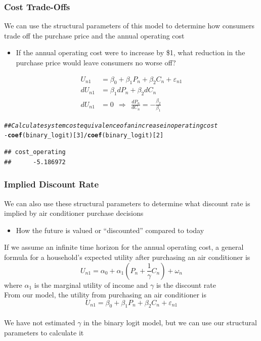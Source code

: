 \documentclass{beamer}\usepackage[]{graphicx}\usepackage[]{color}
\makeatletter
\newcommand{\hlnum}[1]{\textcolor[rgb]{0.686,0.059,0.569}{#1}}%
\newcommand{\hlcom}[1]{\textcolor[rgb]{0.678,0.584,0.686}{\textit{#1}}}%
\newcommand{\hlopt}[1]{\textcolor[rgb]{0,0,0}{#1}}%
\newcommand{\hlstd}[1]{\textcolor[rgb]{0.345,0.345,0.345}{#1}}%
\newcommand{\hlkwd}[1]{\textcolor[rgb]{0.737,0.353,0.396}{\textbf{#1}}}%
\newenvironment{kframe}{%
 \def\at@end@of@kframe{}%
 \ifinner\ifhmode%
  \def\at@end@of@kframe{\end{minipage}}%
  \begin{minipage}{\columnwidth}%
 \fi\fi%
 \def\FrameCommand##1{\hskip\@totalleftmargin \hskip-\fboxsep
 \colorbox{shadecolor}{##1}\hskip-\fboxsep
     \hskip-\linewidth \hskip-\@totalleftmargin \hskip\columnwidth}%
 \MakeFramed {\advance\hsize-\width
   \@totalleftmargin\z@ \linewidth\hsize
   \@setminipage}}%
 {\par\unskip\endMakeFramed%
 \at@end@of@kframe}
\newenvironment{knitrout}{}{} %
\makeatother
\begin{document}
\begin{frame}[fragile]\frametitle{Cost Trade-Offs}
    We can use the structural parameters of this model to determine how consumers trade off the purchase price and the annual operating cost
    \begin{itemize}
        \item If the annual operating cost were to increase by \$1, what reduction in the purchase price would leave consumers no worse off?
    \end{itemize}
    \begin{align*}
        U_{n1} & = \beta_0 + \beta_1 P_n + \beta_2 C_n + \varepsilon_{n1} \\
        dU_{n1} & = \beta_1 dP_n + \beta_2 dC_n \\
        dU_{n1} & = 0 ~~ \Rightarrow ~~ \frac{dP_n}{dC_n}  = -\frac{\beta_2}{\beta_1}
    \end{align*}
\begin{knitrout}\footnotesize
{}\color{fgcolor}\begin{kframe}
\begin{alltt}
\hlcom{## Calculate system cost equivalence of an increase in operating cost}
\hlopt{-}\hlkwd{coef}\hlstd{(binary_logit)[}\hlnum{3}\hlstd{]} \hlopt{/} \hlkwd{coef}\hlstd{(binary_logit)[}\hlnum{2}\hlstd{]}
\end{alltt}
\begin{verbatim}
## cost_operating 
##      -5.186972
\end{verbatim}
\end{kframe}
\end{knitrout}
\end{frame}

\begin{frame}\frametitle{Implied Discount Rate}
    We can also use these structural parameters to determine what discount rate is implied by air conditioner purchase decisions
    \begin{itemize}
        \item How the future is valued or ``discounted'' compared to today
    \end{itemize}
    \vspace{2ex}
    If we assume an infinite time horizon for the annual operating cost, a general formula for a household's expected utility after purchasing an air conditioner is
    $$U_{n1} = \alpha_0 + \alpha_1 \left( P_n + \frac{1}{\gamma} C_n \right) + \omega_n$$
    where $\alpha_1$ is the marginal utility of income and $\gamma$ is the discount rate \\
    \vspace{2ex}
    From our model, the utility from purchasing an air conditioner is
    $$U_{n1} = \beta_0 + \beta_1 P_n + \beta_2 C_n + \varepsilon_{n1}$$ \\
    \vspace{1ex}
    We have not estimated $\gamma$ in the binary logit model, but we can use our structural parameters to calculate it
\end{frame}
\end{document}
